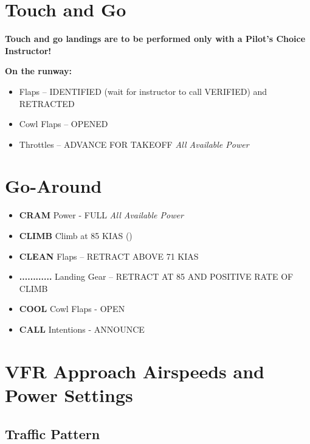 \section{Touch and Go}

\textbf{Touch and go landings are to be performed only with a Pilot’s Choice Instructor!}

\textbf{On the runway:}
\begin{itemize}[label={}]
\item Flaps – IDENTIFIED (wait for instructor to call VERIFIED) and RETRACTED
\item Cowl Flaps – OPENED
\item Throttles – ADVANCE FOR TAKEOFF \emph{All Available Power}
\end{itemize}

\section{Go-Around}


\begin{itemize}[label={}]
\item \textbf{CRAM} Power - FULL \emph{All Available Power}
\item \textbf{CLIMB} Climb at 85 KIAS (\vyse)
\item \textbf{CLEAN} Flaps – RETRACT ABOVE 71 KIAS
\item \textbf{............} Landing Gear – RETRACT AT 85 AND POSITIVE RATE OF CLIMB
\item \textbf{COOL} Cowl Flaps - OPEN
\item \textbf{CALL} Intentions - ANNOUNCE
\end{itemize}

\newpage

\section{VFR Approach Airspeeds and Power Settings}

\subsection{Traffic Pattern}


